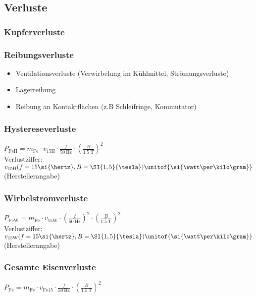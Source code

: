 \begin{sectionbox}
\subsection{Verluste}
\subsubsection{Kupferverluste}
\begin{center}
\end{center}

\subsubsection{Reibungsverluste}
\begin{itemize}
\item Ventilationsverluste (Verwirbelung im Kühlmittel, Strömungsverluste)
\item Lagerreibung
\item Reibung an Kontaktflächen (z.B Schleifringe, Kommutator)
\end{itemize}

\subsubsection{Hystereseverluste}
$P_\text{FeH}=m_\text{Fe} \cdot v_{15\text{H}} \cdot \frac{f}{\SI{50}{\hertz}} \cdot (\frac{B}{\SI{1,5}{\tesla}})^2$\\
Verlustziffer: $v_{15\text{H}}(f=15\si{\hertz},B=\SI{1,5}{\tesla})\unitof{\si{\watt\per\kilo\gram}}$ (Herstellerangabe)

\subsubsection{Wirbelstromverluste}
$P_\text{FeW}=m_\text{Fe} \cdot v_{15\text{W}} \cdot (\frac{f}{\SI{50}{\hertz}})^2 \cdot (\frac{B}{\SI{1,5}{\tesla}})^2$\\
Verlustziffer: $v_{15\text{W}}(f=15\si{\hertz},B=\SI{1,5}{\tesla})\unitof{\si{\watt\per\kilo\gram}}$ (Herstellerangabe)

\subsubsection{Gesamte Eisenverluste}
$P_\text{Fe}=m_\text{Fe} \cdot v_{\text{Fe}15} {\cdot} \frac{f}{\SI{50}{\hertz}}\cdot(\frac{B}{\SI{1,5}{\tesla}})^2$\\


\end{sectionbox}
